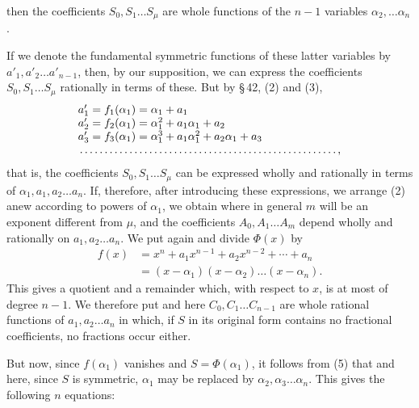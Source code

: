 then the coefficients $S_0,S_1\ldots S_\mu$ are whole  functions of the $n-1$ variables $\alpha_2,\ldots\alpha_n$.

If we denote the fundamental symmetric functions of these latter variables by $a'_1,a'_2\ldots a'_{n-1}$, then, by our supposition, we can express the coefficients $S_0,S_1\ldots S_\mu$ rationally in terms of these. But by \S\,42, (2) and (3),
\[
\begin{array}{l}
 a'_1=f_1(\alpha_1)=\alpha_1+a_1\\
 a'_2=f_2(\alpha_1)=\alpha_1^2+a_1\alpha_1+a_2\\
 a'_3=f_3(\alpha_1)=\alpha_1^3+a_1\alpha_1^2+a_2\alpha_1+a_3\\
 \makebox[23em][l]{\dotfill},
\end{array}
\]
that is, the coefficients $S_0,S_1\ldots S_\mu$ can be expressed wholly and rationally in terms of $\alpha_1,a_1,a_2\ldots a_n$. If, therefore, after introducing these expressions, we arrange (2) anew according to powers of $\alpha_1$, we obtain
where in general $m$ will be an exponent different from $\mu$, and the coefficients $A_0,A_1\ldots A_m$ depend wholly and rationally on $a_1,a_2\ldots a_n$. We put again
and divide $\Phi(x)$ by
\[
\begin{aligned}
 f(x)&=x^n+a_1x^{n-1}+a_2x^{n-2}+\cdots+a_n\\
     &=(x-\alpha_1)(x-\alpha_2)\ldots(x-\alpha_n).
\end{aligned}
\]
This gives a quotient and a remainder which, with respect to $x$, is at most of degree $n-1$. We therefore put
and here $C_0,C_1\ldots C_{n-1}$ are whole rational functions of $a_1,a_2\ldots a_n$ in which, if $S$ in its original form contains no fractional coefficients, no fractions occur either.

But now, since $f(\alpha_1)$ vanishes and $S=\Phi(\alpha_1)$, it follows from (5) that
and here, since $S$ is symmetric, $\alpha_1$ may be replaced by $\alpha_2,\alpha_3\ldots\alpha_n$. This gives the following $n$ equations:
